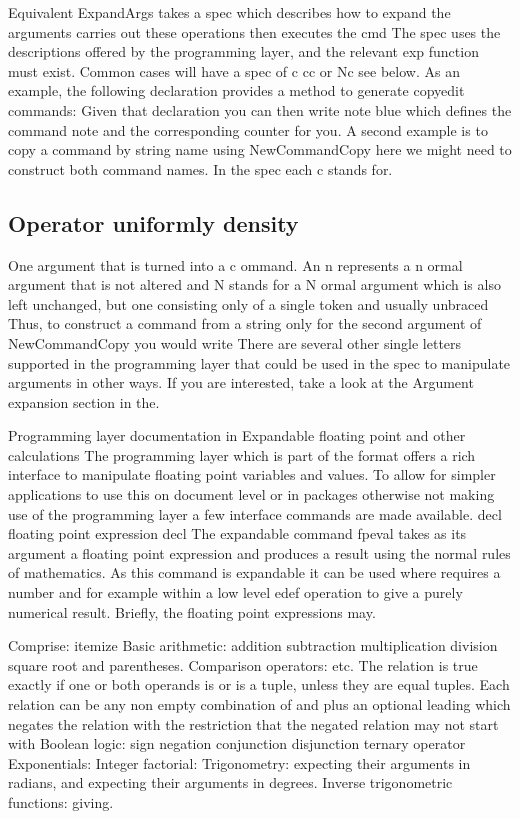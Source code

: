 \documentclass{article}
\begin{document}
Equivalent ExpandArgs takes a spec which describes how to expand the arguments carries out these operations then executes the cmd The spec uses the descriptions offered by the programming layer, and the relevant exp function must exist. Common cases will have a spec of c cc or Nc see below. As an example, the following declaration provides a method to generate copyedit commands: Given that declaration you can then write note blue which defines the command note and the corresponding counter for you. A second example is to copy a command by string name using NewCommandCopy here we might need to construct both command names. In the spec each c stands for.

\subsection{Operator uniformly density}
One argument that is turned into a c ommand. An n represents a n ormal argument that is not altered and N stands for a N ormal argument which is also left unchanged, but one consisting only of a single token and usually unbraced Thus, to construct a command from a string only for the second argument of NewCommandCopy you would write There are several other single letters supported in the programming layer that could be used in the spec to manipulate arguments in other ways. If you are interested, take a look at the Argument expansion section in the.

Programming layer documentation in Expandable floating point and other calculations The programming layer which is part of the format offers a rich interface to manipulate floating point variables and values. To allow for simpler applications to use this on document level or in packages otherwise not making use of the programming layer a few interface commands are made available. decl floating point expression decl The expandable command fpeval takes as its argument a floating point expression and produces a result using the normal rules of mathematics. As this command is expandable it can be used where requires a number and for example within a low level edef operation to give a purely numerical result. Briefly, the floating point expressions may.

Comprise: itemize Basic arithmetic: addition subtraction multiplication division square root and parentheses. Comparison operators: etc. The relation is true exactly if one or both operands is or is a tuple, unless they are equal tuples. Each relation can be any non empty combination of and plus an optional leading which negates the relation with the restriction that the negated relation may not start with Boolean logic: sign negation conjunction disjunction ternary operator Exponentials: Integer factorial: Trigonometry: expecting their arguments in radians, and expecting their arguments in degrees. Inverse trigonometric functions: giving.
\end{document}

